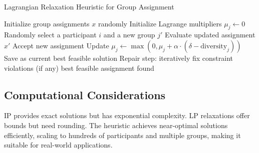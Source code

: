 \begin{algorithm}[H]
\caption*{Lagrangian Relaxation Heuristic for Group Assignment}
\begin{algorithmic}[1]
\State Initialize group assignments $x$ randomly
\State Initialize Lagrange multipliers $\mu_j \gets 0$
        \State Randomly select a participant $i$ and a new group $j'$
            \State Evaluate updated assignment $x'$
                \State Accept new assignment
            \EndIf
        \EndIf
    \EndFor
        \State Update $\mu_j \gets \max(0, \mu_j + \alpha \cdot (\delta - \text{diversity}_j))$
    \EndFor
        \State Save as current best feasible solution
    \EndIf
\EndFor
\State Repair step: iteratively fix constraint violations (if any)
\State \Return best feasible assignment found
\end{algorithmic}
\end{algorithm}

\subsection*{Computational Considerations}
IP provides exact solutions but has exponential complexity. LP relaxations offer bounds but need rounding. The heuristic achieves near-optimal solutions efficiently, scaling to hundreds of participants and multiple groups, making it suitable for real-world applications.